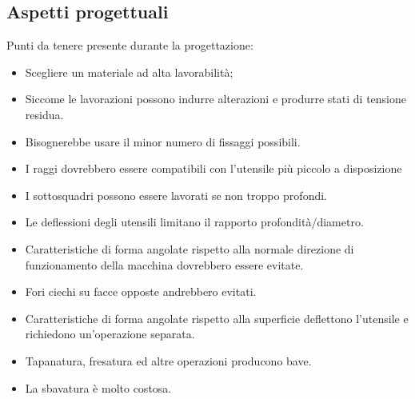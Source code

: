 \subsection{Aspetti progettuali}
Punti da tenere presente durante la progettazione:
\begin{itemize}
\item Scegliere un materiale ad alta lavorabilità;
\item Siccome le lavorazioni possono indurre alterazioni e produrre stati di tensione residua.
\item Bisognerebbe usare il minor numero di fissaggi possibili.
\item I raggi dovrebbero essere compatibili con l'utensile più piccolo a disposizione
\item I sottosquadri possono essere lavorati se non troppo profondi.
\item Le deflessioni degli utensili limitano il rapporto profondità/diametro.
\item Caratteristiche di forma angolate rispetto alla normale direzione di funzionamento della macchina dovrebbero essere evitate.
\item Fori ciechi su facce opposte andrebbero evitati.
\item Caratteristiche di forma angolate rispetto alla superficie deflettono l'utensile e richiedono un'operazione separata.
\item Tapanatura, fresatura ed altre operazioni producono bave.
\item La sbavatura è molto costosa.
\end{itemize}